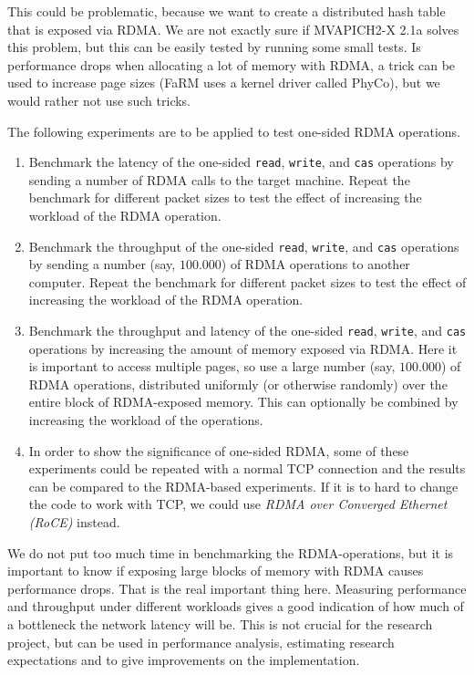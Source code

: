 This could be problematic, because we want to create a distributed hash table that is exposed via RDMA. We are not exactly sure if MVAPICH2-X 2.1a solves this problem, but this can be easily tested by running some small tests. Is performance drops when allocating a lot of memory with RDMA, a trick can be used to increase page sizes (FaRM uses a kernel driver called PhyCo), but we would rather not use such tricks.

The following experiments are to be applied to test one-sided RDMA operations.

\begin{enumerate}
	\item Benchmark the latency of the one-sided \texttt{read}, \texttt{write}, and \texttt{cas} operations by sending a number of RDMA calls to the target machine. Repeat the benchmark for different packet sizes to test the effect of increasing the workload of the RDMA operation.
	\item Benchmark the throughput of the one-sided \texttt{read}, \texttt{write}, and \texttt{cas} operations by sending a number (say, $100.000$) of RDMA operations to another computer. Repeat the benchmark for different packet sizes to test the effect of increasing the workload of the RDMA operation.
	\item Benchmark the throughput and latency of the one-sided \texttt{read}, \texttt{write}, and \texttt{cas} operations by increasing the amount of memory exposed via RDMA. Here it is important to access multiple pages, so use a large number (say, $100.000$) of RDMA operations, distributed uniformly (or otherwise randomly) over the entire block of RDMA-exposed memory. This can optionally be combined by increasing the workload of the operations.
	\item In order to show the significance of one-sided RDMA, some of these experiments could be repeated with a normal TCP connection and the results can be compared to the RDMA-based experiments. If it is to hard to change the code to work with TCP, we could use \emph{RDMA over Converged Ethernet (RoCE)} instead.
\end{enumerate}

We do not put too much time in benchmarking the RDMA-operations, but it is important to know if exposing large blocks of memory with RDMA causes performance drops. That is the real important thing here. Measuring performance and throughput under different workloads gives a good indication of how much of a bottleneck the network latency will be. This is not crucial for the research project, but can be used in performance analysis, estimating research expectations and to give improvements on the implementation.

